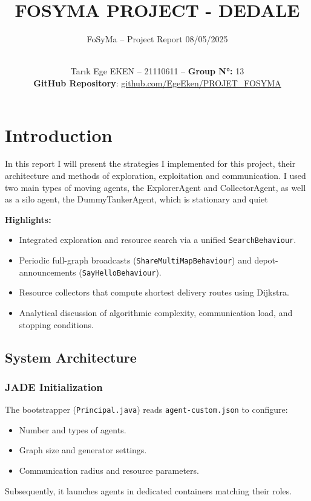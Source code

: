 \documentclass[a4paper, 12pt]{report}
\institute{Sorbonne University}
\title{FOSYMA PROJECT - DEDALE}
\subtitle{FoSyMa – Project Report 08/05/2025}
\author{
\\Tarık Ege \textsc{EKEN} -- 21110611 -- \textbf{Group N°:} 13\\
\textbf{GitHub Repository}: {\href{https://github.com/EgeEken/PROJET_FOSYMA}{github.com/EgeEken/PROJET\_FOSYMA}}
}
\begin{document}
    \maketitle
    \romantableofcontents

    \chapter{Introduction}

    In this report I will present the strategies I implemented for this project, their architecture and methods of exploration, exploitation and communication. I used two main types of moving agents, the ExplorerAgent and CollectorAgent, as well as a silo agent, the DummyTankerAgent, which is stationary and quiet 

\textbf{Highlights:}
\begin{itemize}
  \item Integrated exploration and resource search via a unified \texttt{SearchBehaviour}.
  \item Periodic full-graph broadcasts (\texttt{ShareMultiMapBehaviour}) and depot-announcements (\texttt{SayHelloBehaviour}).
  \item Resource collectors that compute shortest delivery routes using Dijkstra.
  \item Analytical discussion of algorithmic complexity, communication load, and stopping conditions.
\end{itemize}

\section{System Architecture}
\subsection{JADE Initialization}
The bootstrapper (\texttt{Principal.java}) reads \texttt{agent-custom.json} to configure:
\begin{itemize}
  \item Number and types of agents.
  \item Graph size and generator settings.
  \item Communication radius and resource parameters.
\end{itemize}
Subsequently, it launches agents in dedicated containers matching their roles.
\end{document}
